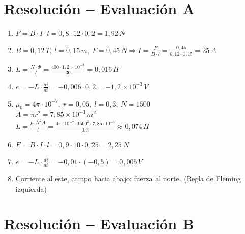 \documentclass[a4paper,12pt]{article}
\begin{document}
\section*{Resolución – Evaluación A}

\begin{enumerate}
\item $F = B \cdot I \cdot l = 0{,}8 \cdot 12 \cdot 0{,}2 = \boxed{1{,}92\,N}$

\item $B = 0{,}12\,T,\ l = 0{,}15\,m,\ F = 0{,}45\,N \Rightarrow I = \frac{F}{B \cdot l} = \frac{0{,}45}{0{,}12 \cdot 0{,}15} = \boxed{25\,A}$

\item $L = \frac{N \cdot \Phi}{I} = \frac{400 \cdot 1{,}2 \times 10^{-3}}{30} = \boxed{0{,}016\,H}$

\item $e = -L \cdot \frac{di}{dt} = -0{,}006 \cdot 0{,}2 = \boxed{-1{,}2 \times 10^{-3}\,V}$

\item $\mu_0 = 4\pi \cdot 10^{-7},\ r = 0{,}05,\ l = 0{,}3,\ N = 1500$\\
$A = \pi r^2 = 7{,}85 \times 10^{-3}\,m^2$\\
$L = \frac{\mu_0 N^2 A}{l} = \frac{4\pi \cdot 10^{-7} \cdot 1500^2 \cdot 7{,}85 \cdot 10^{-3}}{0{,}3} \approx \boxed{0{,}074\,H}$

\item $F = B \cdot I \cdot l = 0{,}9 \cdot 10 \cdot 0{,}25 = \boxed{2{,}25\,N}$

\item $e = -L \cdot \frac{di}{dt} = -0{,}01 \cdot (-0{,}5) = \boxed{0{,}005\,V}$

\item Corriente al este, campo hacia abajo: fuerza al norte. (Regla de Fleming izquierda)

\end{enumerate}

\newpage

\section*{Resolución – Evaluación B}
\end{document}
